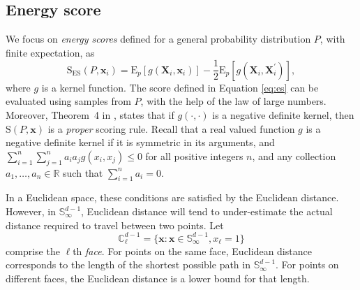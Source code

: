 \subsection{Energy score}
We focus on \emph{energy scores} defined for a general probability distribution $P$, with finite expectation, as 
    \begin{equation}
    \label{eq:es}
    \text{S}_{\text{ES}}\left(P, \bm{x}_i\right) =  \text{E}_p \left[g\left(\bm{X}_i, \bm{x}_i\right)\right] -
                                    \frac{1}{2}\text{E}_p \left[g\left(\bm{X}_i,\bm{X}_i^{\prime}\right)\right],
    \end{equation}
where $g$ is a kernel function. The score defined in Equation \eqref{eq:es} can be evaluated
  using samples from $P$, with the help of the law of large numbers.
  Moreover, Theorem~4 in \cite{gneiting2007}, states that if $g(\cdot,\cdot)$ is a negative 
  definite kernel, then $\text{S}(P,\bm{x})$ is a \emph{proper} scoring rule.  Recall that a 
  real valued function $g$ is a negative definite kernel if it is symmetric in its arguments, 
  and $\sum_{i=1}^n\sum_{j=1}^na_ia_jg(x_i,x_j)\leq 0$ for all positive integers $n$, and any 
  collection $a_1,\ldots,a_n\in{\mathbb R}$ such that  $\sum_{i = 1}^na_i = 0$.  

In a Euclidean space, these conditions are satisfied by the Euclidean distance. However, in
  ${\mathbb S}_{\infty}^{d-1}$, Euclidean distance will tend to under-estimate the actual 
  distance required to travel between two points.  Let
\begin{equation*}
    {\mathbb C}_{\ell}^{d-1} = \lbrace \bm{x} : \bm{x} \in {\mathbb S}_{\infty}^{d-1}, x_{\ell} = 1\rbrace
\end{equation*}
comprise the $\ell$th \emph{face}.  For points on the same face, Euclidean distance 
  corresponds to the length of the shortest possible path in ${\mathbb S}_{\infty}^{d-1}$.  
  For points on different faces, the Euclidean distance is a lower bound for that length.

